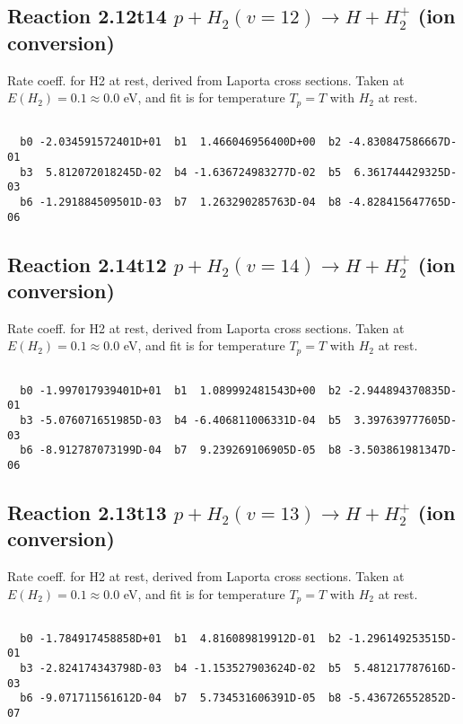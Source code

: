 \documentclass[12pt,dvipdfmx]{article}
\begin{document}
\newpage
\subsection{
Reaction 2.12t14
$ p + H_2(v=12) \rightarrow H + H_2^+$ (ion conversion)
}
Rate coeff. for H2 at rest, derived from Laporta cross sections.
Taken at $E(H_2) = 0.1 \approx 0.0$ eV,  and fit is for temperature $T_p=T$ with $H_2$ at rest.

\begin{small}\begin{verbatim}

  b0 -2.034591572401D+01  b1  1.466046956400D+00  b2 -4.830847586667D-01
  b3  5.812072018245D-02  b4 -1.636724983277D-02  b5  6.361744429325D-03
  b6 -1.291884509501D-03  b7  1.263290285763D-04  b8 -4.828415647765D-06

\end{verbatim}\end{small}

\newpage
\subsection{
Reaction 2.14t12
$ p + H_2(v=14) \rightarrow H + H_2^+$ (ion conversion)
}
Rate coeff. for H2 at rest, derived from Laporta cross sections.
Taken at $E(H_2) = 0.1 \approx 0.0$ eV,  and fit is for temperature $T_p=T$ with $H_2$ at rest.

\begin{small}\begin{verbatim}

  b0 -1.997017939401D+01  b1  1.089992481543D+00  b2 -2.944894370835D-01
  b3 -5.076071651985D-03  b4 -6.406811006331D-04  b5  3.397639777605D-03
  b6 -8.912787073199D-04  b7  9.239269106905D-05  b8 -3.503861981347D-06

\end{verbatim}\end{small}

\newpage
\subsection{
Reaction 2.13t13
$ p + H_2(v=13) \rightarrow H + H_2^+$ (ion conversion)
}
Rate coeff. for H2 at rest, derived from Laporta cross sections.
Taken at $E(H_2) = 0.1 \approx 0.0$ eV,  and fit is for temperature $T_p=T$ with $H_2$ at rest.

\begin{small}\begin{verbatim}

  b0 -1.784917458858D+01  b1  4.816089819912D-01  b2 -1.296149253515D-01
  b3 -2.824174343798D-03  b4 -1.153527903624D-02  b5  5.481217787616D-03
  b6 -9.071711561612D-04  b7  5.734531606391D-05  b8 -5.436726552852D-07

\end{verbatim}\end{small}
\end{document}
